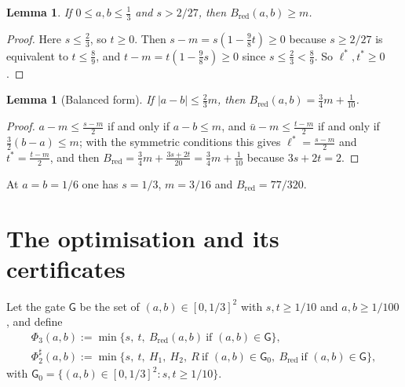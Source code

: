 \documentclass[11pt,reqno]{amsart}
\newtheorem{lemma}[theorem]{Lemma}
\theoremstyle{definition}
\theoremstyle{remark}
\numberwithin{equation}{section}
\newcommand{\ub}{\bar u}
\newcommand{\Bred}{B_{\mathrm{red}}}
\newcommand{\lst}{\ell^{*}}
\newcommand{\tst}{t^{*}}
\begin{document}
\begin{lemma}\label{lem:Bredm}
If $0\le a,b\le\frac13$ and $s>2/27$, then $\Bred(a,b)\ge m$.
\end{lemma}
\begin{proof}
Here $s\le\frac23$, so $t\ge0$. Then $s-m=s(1-\frac98t)\ge0$ because $s\ge2/27$
is equivalent to $t\le\frac89$, and $t-m=t(1-\frac98s)\ge0$ since $s\le\frac23<\frac89$. So
$\lst,\tst\ge0$.
\end{proof}

\begin{lemma}[Balanced form]\label{lem:balanced}
If $|a-b|\le\frac23m$, then $\Bred(a,b)=\frac34m+\frac1{10}$.
\end{lemma}
\begin{proof}
$a-m\le\frac{s-m}2$ if and only if $a-b\le m$, and $\ub-m\le\frac{t-m}2$ if
and only if $\frac32(b-a)\le m$; with the symmetric conditions this gives
$\lst=\frac{s-m}2$ and $\tst=\frac{t-m}2$, and then
$\Bred=\frac34m+\frac{3s+2t}{20}=\frac34m+\frac1{10}$ because $3s+2t=2$.
\end{proof}
At $a=b=1/6$ one has $s=1/3$, $m=3/16$ and $\Bred=77/320$.

\section{The optimisation and its certificates}\label{sec:cert}

Let the gate $\mathsf G$ be the set of $(a,b)\in[0,1/3]^2$ with $s,t\ge1/10$
and $a,b\ge1/100$, and define
\begin{gather*}
\Phi_3(a,b):=\min\{s,\ t,\ \Bred(a,b)\ \text{if }(a,b)\in\mathsf G\},\\
\Phi_2^\sharp(a,b):=\min\{s,\ t,\ H_1,\ H_2,\ R\ \text{if }(a,b)\in\mathsf G_0,\ \Bred\ \text{if }(a,b)\in\mathsf G\},
\end{gather*}
with $\mathsf G_0=\{(a,b)\in[0,1/3]^2:s,t\ge1/10\}$.
\end{document}

